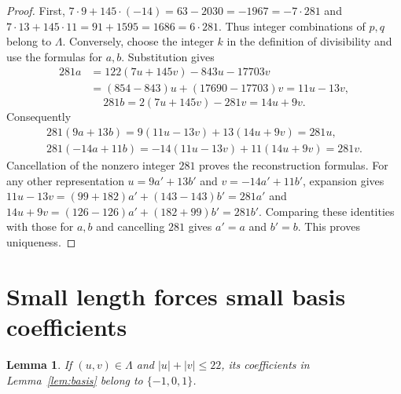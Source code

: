 \documentclass{article}
\newtheorem{lemma}{Lemma}
\begin{document}
\begin{proof}
  First, \(7 \cdot 9 + 145 \cdot (-14) = 63 - 2030 = -1967 = -7 \cdot 281\) and
  \(7 \cdot 13 + 145 \cdot 11 = 91 + 1595 = 1686 = 6 \cdot 281\). Thus integer
  combinations of \(p, q\) belong to \(\Lambda\). Conversely, choose the integer \(k\) in
  the definition of divisibility and use the formulas for \(a, b\). Substitution gives
  \begin{align}
    281a &= 122(7u + 145v) - 843u - 17703v \\
         &= (854 - 843)u + (17690 - 17703)v = 11u - 13v,
  \end{align}
  \begin{equation}
    281b = 2(7u + 145v) - 281v = 14u + 9v.
  \end{equation}
  Consequently
  \begin{gather}
    281(9a + 13b) = 9(11u - 13v) + 13(14u + 9v) = 281u, \\
    281(-14a + 11b) = -14(11u - 13v) + 11(14u + 9v) = 281v.
  \end{gather}
  Cancellation of the nonzero integer \(281\) proves the reconstruction formulas. For any
  other representation \(u = 9a' + 13b'\) and \(v = -14a' + 11b'\), expansion gives
  \(11u - 13v = (99 + 182)a' + (143 - 143)b' = 281a'\) and
  \(14u + 9v = (126 - 126)a' + (182 + 99)b' = 281b'\). Comparing these identities with
  those for \(a, b\) and cancelling \(281\) gives \(a' = a\) and \(b' = b\). This proves
  uniqueness.
\end{proof}

\section{Small length forces small basis coefficients}\label{sec:small}

\begin{lemma}\label{lem:small}
  If \((u, v) \in \Lambda\) and \(\lvert u\rvert + \lvert v\rvert \le 22\), its
  coefficients in Lemma~\ref{lem:basis} belong to \(\{-1, 0, 1\}\).
\end{lemma}
\end{document}
